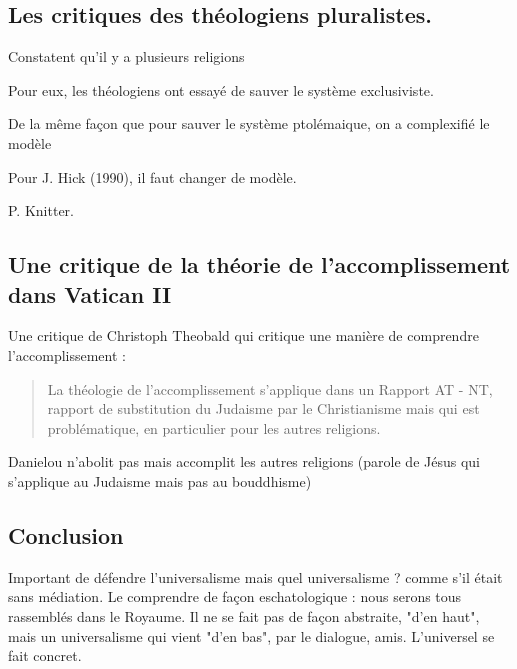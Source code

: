    
    
    \subsection{Les critiques des théologiens pluralistes.}
    
   \begin{Def}
    Constatent qu'il y a plusieurs religions
   \end{Def}
   
   Pour eux, les théologiens ont essayé de sauver le système exclusiviste.
   \begin{Ex}
   De la même façon que pour sauver le système ptolémaique, on a complexifié le modèle
   \end{Ex}
    
    Pour J. Hick  (1990), il faut changer de modèle. 
    
    P. Knitter.

    \subsection{Une critique de la théorie de l'accomplissement dans Vatican
    II}
    
    Une critique de Christoph Theobald qui critique une manière de comprendre l'accomplissement : 
    \begin{quote}
        La théologie de l'accomplissement s'applique dans un Rapport AT - NT, rapport de substitution du Judaisme par le Christianisme mais qui est problématique, en particulier pour les autres religions. 
    \end{quote}
    Danielou n'abolit pas mais accomplit les autres religions (parole de Jésus qui s'applique au Judaisme mais pas au bouddhisme)
 
\subsection{Conclusion}

Important de défendre l'universalisme mais quel universalisme ? comme s'il était sans médiation.
Le comprendre de façon eschatologique : nous serons tous rassemblés dans le Royaume. Il ne se fait pas de façon abstraite, "d'en haut", mais un universalisme qui vient "d'en bas", par le dialogue, amis. L'universel se fait concret.




